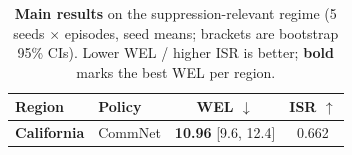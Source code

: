 \begin{table}[t]
\centering
\caption{\textbf{Main results} on the suppression-relevant regime (5 seeds $\times$ episodes, seed means; brackets are bootstrap 95\% CIs). Lower WEL / higher ISR is better; \textbf{bold} marks the best WEL per region.}
\label{tab:main_results}
\begin{tabular}{llcc}
\toprule
Region & Policy & WEL $\downarrow$ & ISR $\uparrow$ \\
\midrule
\multirow{1}{*}{\textbf{California}}
& CommNet & \textbf{10.96} \small{[9.6, 12.4]} & 0.662 \\
\bottomrule
\end{tabular}
\end{table}
